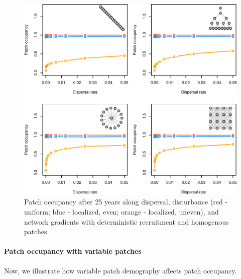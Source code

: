 \documentclass[
]{article}
\begin{document}
\begin{figure}[H]

{\centering \includegraphics{Managing_for_ecological_surprises_in_metapopulations_files/figure-latex/patch occupancy-1} 

}

\caption{Patch occupancy after 25 years along dispersal, disturbance (red - uniform; blue - localized, even; orange - localized, uneven), and network gradients with deterministic recruitment and homogenous patches.}\label{fig:patch occupancy}
\end{figure}
\newpage

\hypertarget{patch-occupancy-with-variable-patches}{%
\paragraph{Patch occupancy with variable
patches}\label{patch-occupancy-with-variable-patches}}

Now, we illustrate how variable patch demography affects patch
occupancy.
\end{document}
